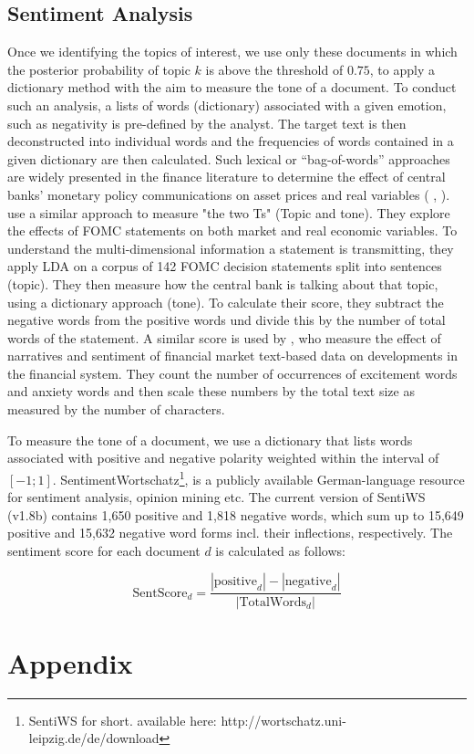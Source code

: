 \documentclass[12pt,a4paper,notitlepage]{article}
\begin{document}
\subsection{Sentiment Analysis}

Once we identifying the topics of interest, we use only these documents in which the posterior probability of topic $k$ is above the threshold of $0.75$, to apply a dictionary method with the aim to measure the tone of a document. To conduct such an analysis, a lists of words (dictionary) associated with a given emotion, such as negativity is pre-defined by the analyst. The target text is then deconstructed into individual words and the frequencies of words contained in a given dictionary are then calculated. Such lexical or “bag-of-words” approaches are widely presented in the finance literature to  determine  the  effect  of  central  banks’  monetary  policy  communications on asset prices and real variables (\citet{nyman_news_2018} \citep{tetlock_giving_2007}, \citep{tetlock_more_2008}). \citet{hansen_shocking_2016} use a similar approach to measure "the two Ts" (Topic and tone). They explore the effects of FOMC statements on both market and real economic variables. To understand the multi-dimensional information a statement is transmitting, they apply LDA on a corpus of 142 FOMC decision statements split into sentences (topic). They then measure how the central bank is talking about that topic, using a dictionary approach (tone). To calculate their score, they subtract the negative words from the positive words und divide this by the number of total words of the statement. A similar score is used by \citet{nyman_news_2018}, who measure the effect of narratives and sentiment of financial market text-based data on developments in the financial system. They count the number of occurrences of excitement words and anxiety words and then scale these numbers by the total text size as measured by the number of characters.

To measure the tone of a document, we use a dictionary that lists words associated with positive and negative polarity weighted within the interval of $[-1; 1]$. SentimentWortschatz\footnote{SentiWS for short. available here: http://wortschatz.uni-leipzig.de/de/download}, is a publicly available German-language resource for sentiment analysis, opinion mining etc. The current version of SentiWS (v1.8b) contains 1,650 positive and 1,818 negative words, which sum up to 15,649 positive and 15,632 negative word forms incl. their inflections, respectively. The sentiment score for each document $d$ is calculated as follows:
 
\begin{equation}
	\text{SentScore}_d = \frac{|\text{positive}_d| - |\text{negative}_d|}{|\text{TotalWords}_d|}
\end{equation}


\section*{Appendix}
\end{document}
